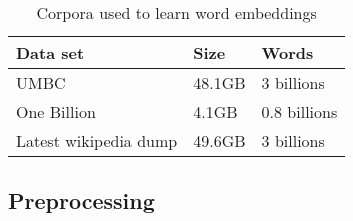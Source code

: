\begin{table}[h]
\begin{center}
\begin{small}
\begin{tabular}{lll}
\hline
\textbf{Data set} & \textbf{Size} & \textbf{Words} \\ \hline
UMBC 	& 48.1GB & 3 billions \\
One Billion 	& 4.1GB & 0.8 billions  \\
Latest wikipedia dump & 49.6GB & 3 billions \\ \hline
\end{tabular}
\end{small}
\caption{Corpora used to learn word embeddings}
\label{wordEmbedCorpora}
\end{center}
\end{table}

\subsection{Preprocessing}

